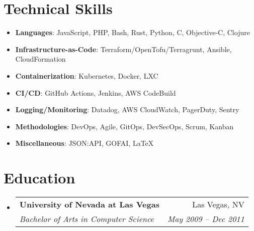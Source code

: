 \documentclass[letterpaper,11pt]{article}
\makeatletter
\newcommand{\resumeSubheading}[4]{
  \vspace{-2pt}\item
    \begin{tabular*}{0.97\textwidth}[t]{l@{\extracolsep{\fill}}r}
      \textbf{#1} & #2 \\
      \textit{\small#3} & \textit{\small #4} \\
    \end{tabular*}\vspace{-7pt}
}
\newcommand{\resumeSubHeadingListStart}{\begin{itemize}[leftmargin=0.15in, label={}]}
\newcommand{\resumeSubHeadingListEnd}{\end{itemize}}
\newenvironment{resumeListicle}{
    \small        %
    \setlength{\itemsep}{0pt}
    \setlength{\parskip}{0pt}
}{}
\newcommand{\resumeListicleStart}{\begin{resumeListicle}}
\newcommand{\resumeListicleEnd}{\end{resumeListicle}}
\newcommand{\resumeListicleItem}[2]{%
  \item \textbf{#1}: #2%
}
\makeatother
\begin{document}
\section{Technical Skills}
  \resumeSubHeadingListStart
    \resumeListicleStart
      \resumeListicleItem{Languages}{JavaScript, PHP, Bash, Rust, Python, C, Objective-C, Clojure } \\
      \resumeListicleItem{Infrastructure-as-Code}{Terraform/OpenTofu/Terragrunt, Ansible, CloudFormation } \\
      \resumeListicleItem{Containerization}{Kubernetes, Docker, LXC } \\
      \resumeListicleItem{CI/CD}{GitHub Actions, Jenkins, AWS CodeBuild } \\
      \resumeListicleItem{Logging/Monitoring}{Datadog, AWS CloudWatch, PagerDuty, Sentry } \\
      \resumeListicleItem{Methodologies}{DevOps, Agile, GitOps, DevSecOps, Scrum, Kanban } \\
      \resumeListicleItem{Miscellaneous}{JSON:API, GOFAI, \LaTeX{} } \\
    \resumeListicleEnd
  \resumeSubHeadingListEnd

\section{Education}
  \resumeSubHeadingListStart
    \resumeSubheading
      {University of Nevada at Las Vegas}{Las Vegas, NV}
      {Bachelor of Arts in Computer Science}{May 2009 – Dec 2011}
  \resumeSubHeadingListEnd

\end{document}
